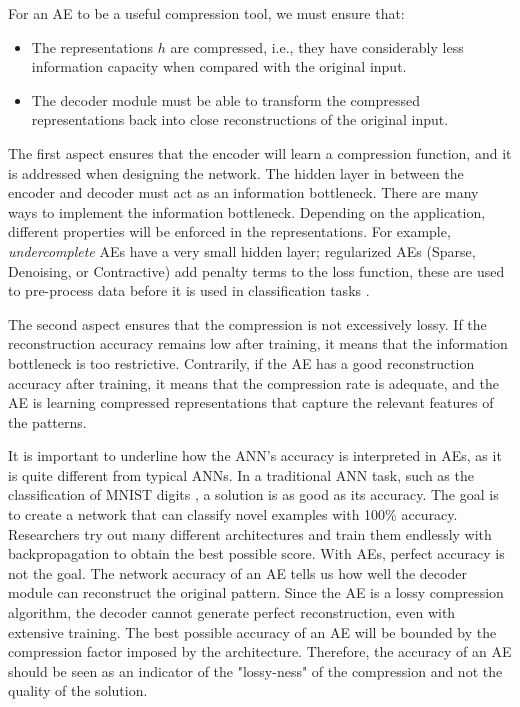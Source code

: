 \documentclass{article}
\begin{document}
For an AE to be a useful compression tool, we must ensure that:
\begin{itemize}
    \item The representations $h$ are compressed, i.e., they have considerably less information capacity when compared with the original input.
    \item The decoder module must be able to transform the compressed representations back into close reconstructions of the original input.
\end{itemize}

The first aspect ensures that the encoder will learn a compression function, and it is addressed when designing the network.
The hidden layer in between the encoder and decoder must act as an information bottleneck.
There are many ways to implement the information bottleneck. Depending on the application, different properties will be enforced in the representations. For example, \textit{undercomplete} AEs have a very small hidden layer; regularized AEs (Sparse, Denoising, or Contractive) add penalty terms to the loss function, these are used to pre-process data before it is used in classification tasks \cite{vincent2010stacked}.

The second aspect ensures that the compression is not excessively lossy. If the reconstruction accuracy remains low after training, it means that the information bottleneck is too restrictive. Contrarily, if the AE has a good reconstruction accuracy after training, it means that the compression rate is adequate, and the AE is learning compressed representations that capture the relevant features of the patterns.

It is important to underline how the ANN's accuracy is interpreted in AEs, as it is quite different from typical ANNs. In a traditional ANN task, such as the classification of MNIST digits \cite{lecun1998mnist}, a solution is as good as its accuracy. The goal is to create a network that can classify novel examples with 100\% accuracy. Researchers try out many different architectures and train them endlessly with backpropagation to obtain the best possible score. 
With AEs, perfect accuracy is not the goal. The network accuracy of an AE tells us how well the decoder module can reconstruct the original pattern. Since the AE is a lossy compression algorithm, the decoder cannot generate perfect reconstruction, even with extensive training. The best possible accuracy of an AE will be bounded by the compression factor imposed by the architecture. Therefore, the accuracy of an AE should be seen as an indicator of the "lossy-ness" of the compression and not the quality of the solution.
\end{document}
